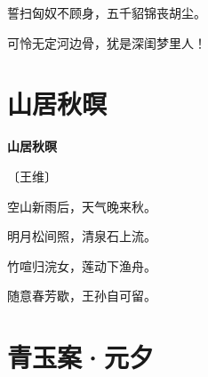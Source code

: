 \documentclass[12pt,UTF-8,openany,fontset=none]{ctexbook}
\begin{document}
    \vspace{18pt}

\begin{center}
    \begin{Large}

        誓扫匈奴不顾身，五千貂锦丧胡尘。

        可怜无定河边骨，犹是深闺梦里人！

    \end{Large}

\end{center}

\vspace{8pt}
\clearpage

\section{山居秋暝}


\begin{center}
    {\bfseries 山居秋暝}

    \vspace{18pt}

    \begin{large}\xuwen
        〔王维〕
    \end{large}

\end{center}

    \vspace{18pt}  %

\begin{center}
    \begin{Large}

        空山新雨后，天气晚来秋。

        明月松间照，清泉石上流。

        竹喧归浣女，莲动下渔舟。

        随意春芳歇，王孙自可留。

    \end{Large}

\end{center}

\vspace{8pt}
\clearpage

\section{青玉案·元夕}

\end{document}
